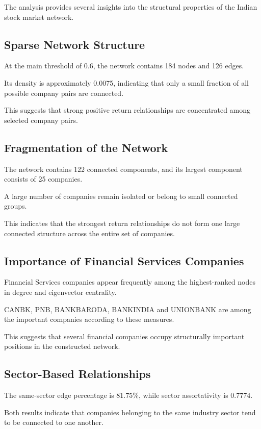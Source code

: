 \documentclass[11pt,a4paper]{article}
\begin{document}
The analysis provides several insights into the
structural properties of the Indian stock market
network.

\subsection{Sparse Network Structure}

At the main threshold of 0.6, the network contains
184 nodes and 126 edges.

Its density is approximately 0.0075, indicating
that only a small fraction of all possible company
pairs are connected.

This suggests that strong positive return
relationships are concentrated among selected
company pairs.

\subsection{Fragmentation of the Network}

The network contains 122 connected components,
and its largest component consists of 25 companies.

A large number of companies remain isolated or
belong to small connected groups.

This indicates that the strongest return relationships
do not form one large connected structure across
the entire set of companies.

\subsection{Importance of Financial Services Companies}

Financial Services companies appear frequently
among the highest-ranked nodes in degree and
eigenvector centrality.

CANBK, PNB, BANKBARODA, BANKINDIA and UNIONBANK
are among the important companies according to
these measures.

This suggests that several financial companies
occupy structurally important positions in the
constructed network.

\subsection{Sector-Based Relationships}

The same-sector edge percentage is 81.75\%,
while sector assortativity is 0.7774.

Both results indicate that companies belonging
to the same industry sector tend to be connected
to one another.
\end{document}
